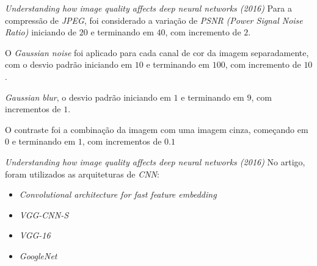     
    

\begin{frame}{\textit{Understanding how image quality affects deep neural networks (2016)}}
    Para a compressão de \textit{JPEG}, foi considerado a variação de \textit{PSNR} \textit{(Power Signal Noise Ratio)} iniciando de $20$ e terminando em $40$, com incremento de $2$.

    \vspace{1em}
    O \textit{Gaussian noise} foi aplicado para cada canal de cor da imagem separadamente, com o desvio padrão iniciando em $10$ e terminando em $100$, com incremento de $10$.
    
    \vspace{1em}
    \textit{Gaussian blur}, o desvio padrão iniciando em $1$ e terminando em $9$, com incrementos de $1$.

    \vspace{1em}
    O contraste foi a combinação da imagem com uma imagem cinza, começando em $0$ e terminando em $1$, com incrementos de $0.1$
\end{frame}
    
\begin{frame}{\textit{Understanding how image quality affects deep neural networks (2016)}}
    No artigo, foram utilizados as arquiteturas de \textit{CNN}:
    \begin{itemize}
        \item \textit{Convolutional architecture for fast feature embedding}
        \item \textit{VGG-CNN-S}
        \item \textit{VGG-16}
        \item \textit{GoogleNet}
    \end{itemize}
\end{frame}

